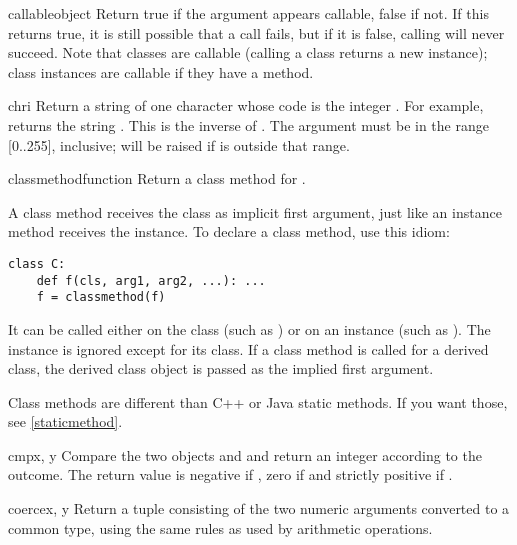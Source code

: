 \begin{funcdesc}{callable}{object}
  Return true if the  argument appears callable, false if
  not.  If this returns true, it is still possible that a call fails,
  but if it is false, calling  will never succeed.  Note
  that classes are callable (calling a class returns a new instance);
  class instances are callable if they have a 
  method.
\end{funcdesc}

\begin{funcdesc}{chr}{i}
  Return a string of one character whose \ASCII{} code is the integer
  .  For example,  returns the string .
  This is the inverse of .  The argument must be in
  the range [0..255], inclusive;  will be raised
  if  is outside that range.
\end{funcdesc}

\begin{funcdesc}{classmethod}{function}
  \label{classmethod}
  Return a class method for .

  A class method receives the class as implicit first argument,
  just like an instance method receives the instance.
  To declare a class method, use this idiom:

\begin{verbatim}
class C:
    def f(cls, arg1, arg2, ...): ...
    f = classmethod(f)
\end{verbatim}

  It can be called either on the class (such as ) or on an
  instance (such as ).  The instance is ignored except for
  its class.
  If a class method is called for a derived class, the derived class
  object is passed as the implied first argument.

  Class methods are different than C++ or Java static methods.
  If you want those, see \ref{staticmethod}.
\end{funcdesc}

\begin{funcdesc}{cmp}{x, y}
  Compare the two objects  and  and return an integer
  according to the outcome.  The return value is negative if , zero if  and strictly positive if
  .
\end{funcdesc}

\begin{funcdesc}{coerce}{x, y}
  Return a tuple consisting of the two numeric arguments converted to
  a common type, using the same rules as used by arithmetic
  operations.
\end{funcdesc}

